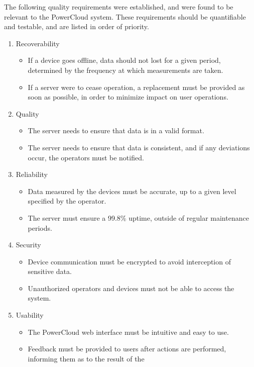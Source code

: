\documentclass{article}
\begin{document}
	The following quality requirements were established, and were found 
	to be relevant to the PowerCloud system. These requirements should be 
	quantifiable and testable, and are listed in order of priority.
	
	\begin{enumerate}
		\item Recoverability
			\begin{itemize}
				\item If a device goes offline, data should not lost for 
				a given period, determined by the frequency at which 
				measurements are taken.
				\item If a server were to cease operation, a replacement 
				must be provided as soon as possible, in order to 
				minimize impact on user operations.
			\end{itemize}
		\item Quality
			\begin{itemize}
				\item The server needs to ensure that data is in a valid 
				format.
				\item The server needs to ensure that data is consistent, 
				and if any deviations occur, the operators must be 
				notified.
			\end{itemize}
		\item Reliability
			\begin{itemize}
				\item Data measured by the devices must be accurate, up 
				to a given level specified by the operator.
				\item The server must ensure a 99.8\% uptime, outside of 
				regular maintenance periods.
			\end{itemize}
		\item Security
			\begin{itemize}
				\item Device communication must be encrypted to avoid 
				interception of sensitive data.
				\item Unauthorized operators and devices must not be able 
				to access the system.
			\end{itemize}
		\item Usability
			\begin{itemize}
				\item The PowerCloud web interface must be intuitive and 
				easy to use.
				\item Feedback must be provided to users after actions 
				are performed, informing them as to the result of the 

\end{itemize}
\end{enumerate}
\end{document}
